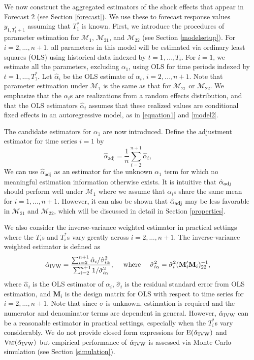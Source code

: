 \documentclass[11pt,3p,review,authoryear]{elsarticle}
\def\mbf#1{\mathbf{#1}} %
\def\mc#1{\mathcal{#1}} %
\def\E#1{\mathrm{E}(#1)} %
\def\var#1{\mathrm{Var}(#1)} %
\theoremstyle{definition}
\begin{document}
We now construct the aggregated estimators of the shock effects that appear in Forecast 2 (see Section \ref{forecast}). We use these to forecast response values $y_{1, T_1^*+1}$ assuming that $T_1^*$ is known.  First, we introduce the procedures of parameter estimation for $\mc{M}_1$, $\mc{M}_{21}$, and $\mc{M}_{22}$ (see Section \ref{modelsetup}). For $i = 2, \ldots, n+1$, all parameters in this model will be estimated via ordinary least squares (OLS) using historical data indexed by $t = 1, \ldots, T_i$. For $i = 1$, we estimate all the parameters, excluding $\alpha_1$, using OLS for time periods indexed by $t=1, \ldots, T_1^*$. Let $\hat{\alpha}_i$ be the OLS estimate of $\alpha_i$, $i = 2, \ldots, n+1$.  Note that parameter estimation under $\mc{M}_1$ is the same as that for $\mc{M}_{21}$ or $\mc{M}_{22}$.  We emphasize that the $\alpha_i$s are realizations from a random effects distribution, and that the OLS estimators $\hat\alpha_i$ assumes that these realized values are conditional fixed effects in an autoregressive model, as in \eqref{equation1} and \eqref{model2}.


The candidate estimators for $\alpha_1$ are now introduced. Define the adjustment estimator for time series $i=1$ by 
\begin{equation} \label{adjusted}
  \hat{\alpha}_{\text{adj}} = \frac{1}{n}\sum_{i=2}^{n+1}\hat{\alpha}_i,
\end{equation}
We can use $\hat{\alpha}_{\text{adj}}$ as an estimator for 
the unknown $\alpha_1$ term for which no meaningful estimation information 
otherwise exists. It is intuitive that $\hat{\alpha}_{\rm adj}$ should perform 
well under $\mc{M}_1$ where we assume that $\alpha_i$s share the same mean 
for $i= 1, \ldots, n+1$. However, it can also be shown that 
$\hat{\alpha}_{\rm adj}$ may be less favorable in $\mc{M}_{21}$ 
and $\mc{M}_{22}$, which will be discussed in detail in Section \ref{properties}. 

We also consider the inverse-variance weighted estimator 
in practical settings where the $T_i$s and $T_i^*$s vary greatly across $i=2, \ldots, n+1$. 
The inverse-variance weighted estimator is defined as 
\begin{align*}
  \hat{\alpha}_{\rm IVW} = \frac{\sum_{i=2}^{n+1} \hat{\alpha}_i / \hat{\sigma}_{i\alpha}^2}{\sum_{i=2}^{n+1} 1/\hat{\sigma}_{i\alpha}^2},
  \quad \text{ where } \quad  \hat{\sigma}_{i\alpha}^2 = \hat{\sigma}^2_i( \mathbf{M}_i'\mbf{M}_i)_{22}^{-1},
\end{align*}
where  $\hat{\alpha}_i$ is the OLS estimator of $\alpha_i$, $\hat{\sigma}_i$ is the residual standard error from OLS estimation, and $\mbf{M}_i$ is the design matrix for OLS with respect to time series for $i = 2, \ldots, n+1$. Note that since $\sigma$ is unknown, estimation is required and the numerator and denominator terms are dependent in general. However, $\hat{\alpha}_{\rm IVW}$ can be a reasonable estimator in practical settings, especially when the $T^*_i$s vary considerably. We do not provide closed form expressions for $\E{\hat{\alpha}_{\rm IVW}}$ and $\var{\hat{\alpha}_{\rm IVW}}$ but empirical performance of $\hat{\alpha}_{\rm IVW}$ is assessed via Monte Carlo simulation (see Section \ref{simulation}).
\end{document}
